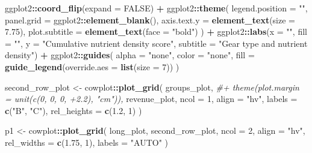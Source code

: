 \documentclass[
]{book}
\newenvironment{Shaded}{\begin{snugshade}}{\end{snugshade}}
\newcommand{\AttributeTok}[1]{\textcolor[rgb]{0.13,0.29,0.53}{#1}}
\newcommand{\CommentTok}[1]{\textcolor[rgb]{0.56,0.35,0.01}{\textit{#1}}}
\newcommand{\ConstantTok}[1]{\textcolor[rgb]{0.56,0.35,0.01}{#1}}
\newcommand{\DecValTok}[1]{\textcolor[rgb]{0.00,0.00,0.81}{#1}}
\newcommand{\FloatTok}[1]{\textcolor[rgb]{0.00,0.00,0.81}{#1}}
\newcommand{\FunctionTok}[1]{\textcolor[rgb]{0.13,0.29,0.53}{\textbf{#1}}}
\newcommand{\NormalTok}[1]{#1}
\newcommand{\OtherTok}[1]{\textcolor[rgb]{0.56,0.35,0.01}{#1}}
\newcommand{\SpecialCharTok}[1]{\textcolor[rgb]{0.81,0.36,0.00}{\textbf{#1}}}
\newcommand{\StringTok}[1]{\textcolor[rgb]{0.31,0.60,0.02}{#1}}
\begin{document}
\begin{Shaded}
\begin{Highlighting}[]
\NormalTok{  ggplot2}\SpecialCharTok{::}\FunctionTok{coord\_flip}\NormalTok{(}\AttributeTok{expand =} \ConstantTok{FALSE}\NormalTok{) }\SpecialCharTok{+}
\NormalTok{  ggplot2}\SpecialCharTok{::}\FunctionTok{theme}\NormalTok{(}
    \AttributeTok{legend.position =} \StringTok{""}\NormalTok{,}
    \AttributeTok{panel.grid =}\NormalTok{ ggplot2}\SpecialCharTok{::}\FunctionTok{element\_blank}\NormalTok{(),}
    \AttributeTok{axis.text.y =} \FunctionTok{element\_text}\NormalTok{(}\AttributeTok{size =} \FloatTok{7.75}\NormalTok{),}
    \AttributeTok{plot.subtitle =} \FunctionTok{element\_text}\NormalTok{(}\AttributeTok{face =} \StringTok{"bold"}\NormalTok{)}
\NormalTok{  ) }\SpecialCharTok{+}
\NormalTok{  ggplot2}\SpecialCharTok{::}\FunctionTok{labs}\NormalTok{(}\AttributeTok{x =} \StringTok{""}\NormalTok{, }\AttributeTok{fill =} \StringTok{""}\NormalTok{, }\AttributeTok{y =} \StringTok{"Cumulative nutrient density score"}\NormalTok{, }\AttributeTok{subtitle =} \StringTok{"Gear type and nutrient density"}\NormalTok{) }\SpecialCharTok{+}
\NormalTok{  ggplot2}\SpecialCharTok{::}\FunctionTok{guides}\NormalTok{(}
    \AttributeTok{alpha =} \StringTok{"none"}\NormalTok{,}
    \AttributeTok{color =} \StringTok{"none"}\NormalTok{,}
    \AttributeTok{fill =} \FunctionTok{guide\_legend}\NormalTok{(}\AttributeTok{override.aes =} \FunctionTok{list}\NormalTok{(}\AttributeTok{size =} \DecValTok{7}\NormalTok{))}
\NormalTok{  )}


\NormalTok{second\_row\_plot }\OtherTok{\textless{}{-}}\NormalTok{ cowplot}\SpecialCharTok{::}\FunctionTok{plot\_grid}\NormalTok{(}
\NormalTok{  groups\_plot, }\CommentTok{\#+ theme(plot.margin = unit(c(0, 0, 0, +2.2), "cm")),}
\NormalTok{  revenue\_plot,}
  \AttributeTok{ncol =} \DecValTok{1}\NormalTok{,}
  \AttributeTok{align =} \StringTok{"hv"}\NormalTok{,}
  \AttributeTok{labels =} \FunctionTok{c}\NormalTok{(}\StringTok{"B"}\NormalTok{, }\StringTok{"C"}\NormalTok{),}
  \AttributeTok{rel\_heights =} \FunctionTok{c}\NormalTok{(}\FloatTok{1.2}\NormalTok{, }\DecValTok{1}\NormalTok{)}
\NormalTok{)}

\NormalTok{p1 }\OtherTok{\textless{}{-}}
\NormalTok{  cowplot}\SpecialCharTok{::}\FunctionTok{plot\_grid}\NormalTok{(}
\NormalTok{    long\_plot,}
\NormalTok{    second\_row\_plot,}
    \AttributeTok{ncol =} \DecValTok{2}\NormalTok{,}
    \AttributeTok{align =} \StringTok{"hv"}\NormalTok{,}
    \AttributeTok{rel\_widths =} \FunctionTok{c}\NormalTok{(}\FloatTok{1.75}\NormalTok{, }\DecValTok{1}\NormalTok{),}
    \AttributeTok{labels =} \StringTok{"AUTO"}
\NormalTok{  )}


\end{Highlighting}
\end{Shaded}
\end{document}
